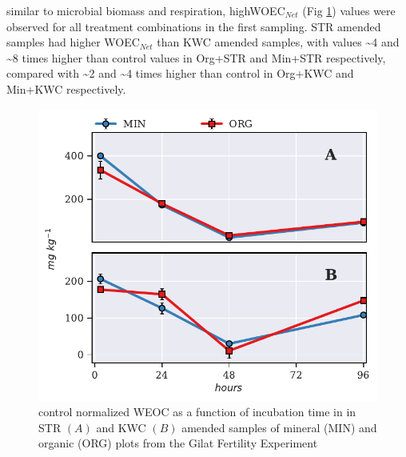 			similar to microbial biomass and respiration, highWOEC$_{Net}$ (Fig \ref{fig:nor_weoc_treated_preliminary}) values were observed for all treatment combinations in the first sampling. STR amended samples had higher WOEC$_{Net}$ than KWC amended samples, with values  \~{}4 and \~{}8 times higher than control values in Org+STR and Min+STR respectively, compared with \~{}2 and \~{}4 times higher than control in Org+KWC and Min+KWC respectively.


			\begin{figure}[H]
				\centering
				\includegraphics[scale=1]{thesis_figures/preliminary/control_normalized/WEOC.pdf}
				\caption{control normalized WEOC  as a function of incubation time in in STR $\left(A\right)$ and KWC $\left(B\right)$ amended samples of mineral (MIN) and organic (ORG) plots from the Gilat Fertility Experiment}
				\label{fig:nor_weoc_treated_preliminary}
			\end{figure}



